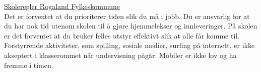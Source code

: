 
%
%
%
%
%
\href{https://lovdata.no/dokument/LF/forskrift/2024-06-11-1396/KAPITTEL_1#KAPITTEL_1}{Skoleregler Rogaland Fylkeskommune}\\
\vskip 0.5cm
 Det er forventet at du prioriterer tiden slik du må i jobb. Du er ansvarlig for at du har nok tid utenom skolen til å gjøre hjemmelekser og innleveringer. På skolen er det forventet at du bruker felles utstyr effektivt slik at alle får komme til. Forstyrrende aktiviteter, som spilling, sosiale medier, surfing på internett, er ikke akseptert i klasserommet når undervisning pågår. Mobiler er ikke lov og ha fremme i timen. 



